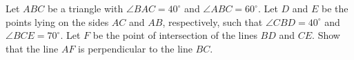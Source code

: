 Let $ABC$ be a triangle with $\angle{BAC} = 40^{\circ}$ and $\angle{ABC}=60^{\circ}$.  Let $D$ and $E$ be the points lying on the sides $AC$ and $AB$,  respectively, such that $\angle{CBD} = 40^{\circ}$ and $\angle{BCE} = 70^{\circ}$.  Let $F$ be the point of intersection of the lines $BD$ and $CE$.  Show that the line $AF$ is perpendicular to the line $BC$.